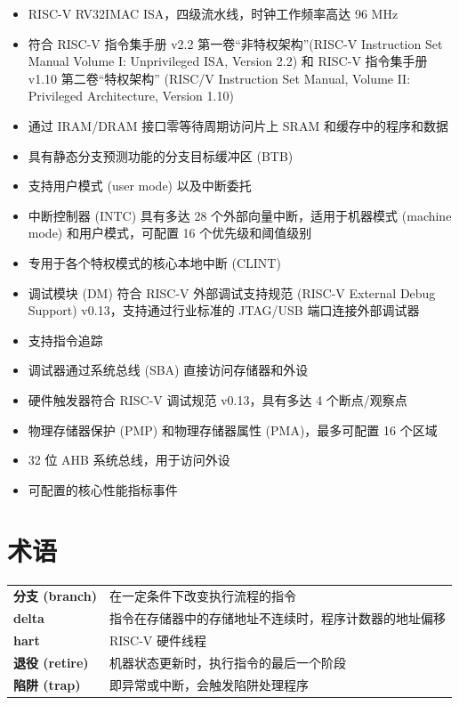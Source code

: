 \documentclass[main\_\_CN.tex]{subfiles}
\begin{document}
\begin{itemize}
    \item RISC-V RV32IMAC ISA，四级流水线，时钟工作频率高达 96 MHz
    \item 符合 RISC-V 指令集手册 v2.2 第一卷“非特权架构”(RISC-V Instruction Set Manual Volume I: Unprivileged ISA, Version 2.2) 和 RISC-V 指令集手册 v1.10 第二卷“特权架构” (RISC\-/V Instruction Set Manual, Volume II: Privileged Architecture, Version 1.10)
    \item 通过 IRAM/DRAM 接口零等待周期访问片上 SRAM 和缓存中的程序和数据
    \item 具有静态分支预测功能的分支目标缓冲区 (BTB)
    \item 支持用户模式 (user mode) 以及中断委托
    \item 中断控制器 (INTC) 具有多达 28 个外部向量中断，适用于机器模式 (machine mode) 和用户模式，可配置 16 个优先级和阈值级别
    \item 专用于各个特权模式的核心本地中断 (CLINT)
    \item 调试模块 (DM) 符合 RISC-V 外部调试支持规范 (RISC-V External Debug Support) v0.13，支持通过行业标准的 JTAG/USB 端口连接外部调试器
    \item 支持指令追踪
    \item 调试器通过系统总线 (SBA) 直接访问存储器和外设
    \item 硬件触发器符合 RISC-V 调试规范 v0.13，具有多达 4 个断点/观察点
    \item 物理存储器保护 (PMP) 和物理存储器属性 (PMA)，最多可配置 16 个区域
    \item 32 位 AHB 系统总线，用于访问外设
    \item 可配置的核心性能指标事件
\end{itemize}

\section{术语}

\begin{longtable}[c]{ R{4cm} p{12cm} }
\textbf{分支 (branch)} & 在一定条件下改变执行流程的指令 \\
\textbf{delta} & 指令在存储器中的存储地址不连续时，程序计数器的地址偏移 \\
\textbf{hart} &  RISC-V 硬件线程 \\
\textbf{退役 (retire)} & 机器状态更新时，执行指令的最后一个阶段 \\
\textbf{陷阱 (trap)} & 即异常或中断，会触发陷阱处理程序 \\
\end{longtable}
\end{document}
